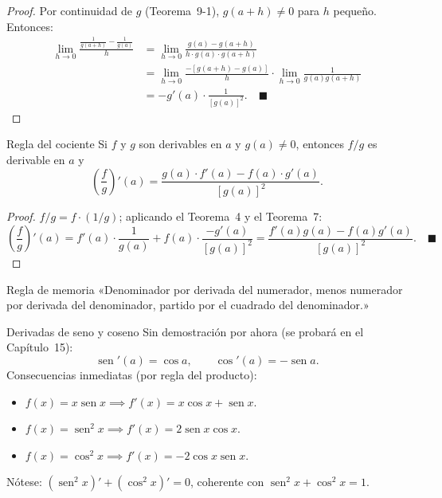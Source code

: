 \documentclass[12pt]{article}
\begin{document}
\begin{proof}
Por continuidad de $g$ (Teorema~9-1), $g(a+h)\neq 0$ para $h$ pequeño. Entonces:
\begin{align*}
\lim_{h\to 0}\frac{\tfrac{1}{g(a+h)}-\tfrac{1}{g(a)}}{h} &= \lim_{h\to 0}\frac{g(a)-g(a+h)}{h\cdot g(a)\cdot g(a+h)} \\
&= \lim_{h\to 0}\frac{-[g(a+h)-g(a)]}{h} \cdot \lim_{h\to 0}\frac{1}{g(a)g(a+h)} \\
&= -g'(a)\cdot\frac{1}{[g(a)]^2}. \quad \blacksquare
\end{align*}
\end{proof}

\begin{teorema}[8]{Regla del cociente}
Si $f$ y $g$ son derivables en $a$ y $g(a)\neq 0$, entonces $f/g$ es derivable en $a$ y
\[ \left(\frac{f}{g}\right)'(a) = \frac{g(a)\cdot f'(a) - f(a)\cdot g'(a)}{[g(a)]^2}. \]
\end{teorema}

\begin{proof}
$f/g = f\cdot(1/g)$; aplicando el Teorema~4 y el Teorema~7:
\[ \left(\frac{f}{g}\right)'(a) = f'(a)\cdot\frac{1}{g(a)} + f(a)\cdot\frac{-g'(a)}{[g(a)]^2} = \frac{f'(a)g(a)-f(a)g'(a)}{[g(a)]^2}. \quad \blacksquare \]
\end{proof}

\begin{nota}[]{Regla de memoria}
«Denominador por derivada del numerador, menos numerador por derivada del denominador, partido por el cuadrado del denominador.»
\end{nota}

\begin{nota}[]{Derivadas de seno y coseno}
Sin demostración por ahora (se probará en el Capítulo~15):
\[ \operatorname{sen}'(a) = \cos a, \qquad \cos'(a) = -\operatorname{sen} a. \]
Consecuencias inmediatas (por regla del producto):
\begin{itemize}
  \item $f(x) = x\operatorname{sen}x \implies f'(x) = x\cos x + \operatorname{sen}x$.
  \item $f(x) = \operatorname{sen}^2 x \implies f'(x) = 2\operatorname{sen}x\cos x$.
  \item $f(x) = \cos^2 x \implies f'(x) = -2\cos x\operatorname{sen}x$.
\end{itemize}
Nótese: $(\operatorname{sen}^2 x)' + (\cos^2 x)' = 0$, coherente con $\operatorname{sen}^2 x + \cos^2 x = 1$.
\end{nota}
\end{document}
